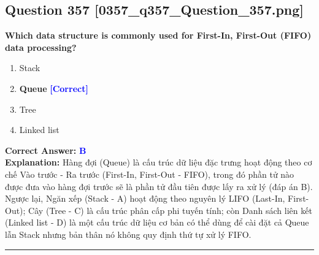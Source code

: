\documentclass[11pt,a4paper]{article}
\begin{document}
\begin{minipage}{\textwidth}
\subsection*{Question 357 \quad \footnotesize{[0357\_q357\_Question\_357.png]}}
\noindent \textbf{Which data structure is commonly used for First-In, First-Out (FIFO) data processing?}

\begin{enumerate}[label=\Alph*.]
    \item Stack
    \item \textbf{Queue} \hfill \textcolor{blue}{\textbf{[Correct]}}
    \item Tree
    \item Linked list
\end{enumerate}

\noindent \textbf{Correct Answer:} \textcolor{blue}{\textbf{B}} \\[2pt]
\noindent \textbf{Explanation:} Hàng đợi (Queue) là cấu trúc dữ liệu đặc trưng hoạt động theo cơ chế Vào trước - Ra trước (First-In, First-Out - FIFO), trong đó phần tử nào được đưa vào hàng đợi trước sẽ là phần tử đầu tiên được lấy ra xử lý (đáp án B). Ngược lại, Ngăn xếp (Stack - A) hoạt động theo nguyên lý LIFO (Last-In, First-Out); Cây (Tree - C) là cấu trúc phân cấp phi tuyến tính; còn Danh sách liên kết (Linked list - D) là một cấu trúc dữ liệu cơ bản có thể dùng để cài đặt cả Queue lẫn Stack nhưng bản thân nó không quy định thứ tự xử lý FIFO.

\par\vspace{0.3cm}
\hrule
\vspace{0.3cm}
\end{minipage}
\end{document}
